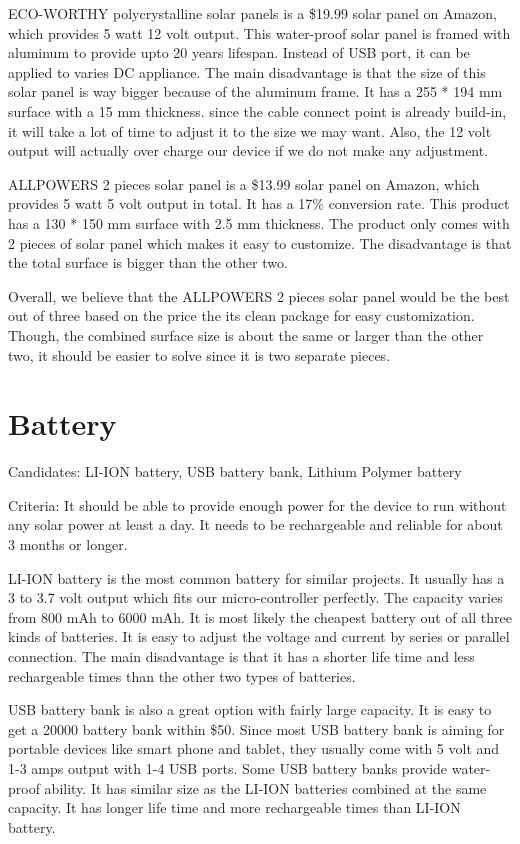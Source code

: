 \documentclass[letterpaper,10pt,titlepage]{article}
\begin{document}
ECO-WORTHY polycrystalline solar panels is a \$19.99 solar panel on Amazon, which provides 5 watt 12 volt output. This water-proof solar panel is framed with aluminum to provide upto 20 years lifespan. Instead of USB port, it can be applied to varies DC appliance. The main disadvantage is that the size of this solar panel is way bigger because of the aluminum frame. It has a 255 * 194 mm surface with a 15 mm thickness. since the cable connect point is already build-in, it will take a lot of time to adjust it to the size we may want. Also, the 12 volt output will actually over charge our device if we do not make any adjustment. 

ALLPOWERS 2 pieces solar panel is a \$13.99 solar panel on Amazon, which provides 5 watt 5 volt output in total. It has a 17\% conversion rate. This product has a 130 * 150 mm surface with 2.5 mm thickness. The product only comes with 2 pieces of solar panel which makes it easy to customize. The disadvantage is that the total surface is bigger than the other two. 

Overall, we believe that the ALLPOWERS 2 pieces solar panel would be the best out of three based on the price the its clean package for easy customization. Though, the combined surface size is about the same or larger than the other two, it should be easier to solve since it is two separate pieces.


\section{Battery}
Candidates: LI-ION battery, USB battery bank, Lithium Polymer battery

Criteria: It should be able to provide enough power for the device to run without any solar power at least a day. It needs to be rechargeable and reliable for about 3 months or longer. 

LI-ION battery is the most common battery for similar projects. It usually has a 3 to 3.7 volt output which fits our micro-controller perfectly. The capacity varies from 800 mAh to 6000 mAh. It is most likely the cheapest battery out of all three kinds of batteries. It is easy to adjust the voltage and current by series or parallel connection. The main disadvantage is that it has a shorter life time and less rechargeable times than the other two types of batteries.

USB battery bank is also a great option with fairly large capacity. It is easy to get a 20000 battery bank within \$50. Since most USB battery bank is aiming for portable devices like smart phone and tablet, they usually come with 5 volt and 1-3 amps output with 1-4 USB ports. Some USB battery banks provide water-proof ability. It has similar size as the LI-ION batteries combined at the same capacity. It has longer life time and more rechargeable times than LI-ION battery.
\end{document}
